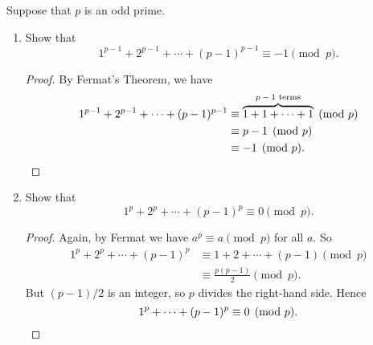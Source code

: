  Suppose that $p$ is an odd prime.
\begin{enumerate}
\item Show that
  \begin{equation*}
    1^{p-1} + 2^{p-1} + \cdots + (p - 1)^{p-1} \equiv -1 \pmod{p}.
  \end{equation*}
  \begin{proof}
    By Fermat's Theorem, we have
    \begin{align*}
      1^{p-1} + 2^{p-1} + \cdots + (p - 1)^{p-1}
      &\equiv \overbrace{1 + 1 + \cdots + 1}^{\text{$p - 1$ terms}} \pmod{p} \\
      &\equiv p - 1 \pmod{p} \\
      &\equiv -1 \pmod{p}. \qedhere
    \end{align*}
  \end{proof}

\item Show that
  \begin{equation*}
    1^p + 2^p + \cdots + (p - 1)^p \equiv 0 \pmod{p}.
  \end{equation*}
  \begin{proof}
    Again, by Fermat we have $a^p\equiv a\pmod{p}$ for all $a$. So
    \begin{align*}
      1^p + 2^p + \cdots + (p-1)^p
      &\equiv 1 + 2 + \cdots + (p - 1) \pmod{p} \\
      &\equiv \frac{p(p - 1)}2 \pmod{p}.
    \end{align*}
    But $(p - 1) / 2$ is an integer, so $p$ divides the right-hand
    side. Hence
    \begin{equation*}
      1^p + \cdots + (p - 1)^p \equiv 0\pmod{p}. \qedhere
    \end{equation*}
  \end{proof}
\end{enumerate}
